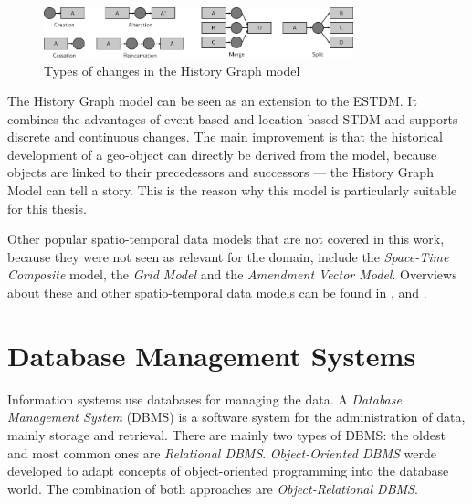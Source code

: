\begin{figure}[ht]
  \vspace{1em}
  \centering
  \includegraphics[width=0.8\textwidth]{graphics/basics/stdm/history_graph_changes}
  \caption{Types of changes in the History Graph model}
  \label{fig:history_graph_changes}
\end{figure}

The History Graph model can be seen as an extension to the ESTDM. It combines the advantages of event-based and location-based STDM and supports discrete and continuous changes. The main improvement is that the historical development of a geo-object can directly be derived from the model, because objects are linked to their precedessors and successors --- the History Graph Model can tell a story. This is the reason why this model is particularly suitable for this thesis.


\vspace{1em}
Other popular spatio-temporal data models that are not covered in this work, because they were not seen as relevant for the domain, include the \emph{Space-Time Composite} model, the \emph{Grid Model} and the \emph{Amendment Vector Model}. Overviews about these and other spatio-temporal data models can be found in \cite{zhao11}, \cite{pelekis04stdms} and \cite{peuquet99}.



\section{Database Management Systems} %
\label{sec:database_management_systems}

Information systems use databases for managing the data. A \emph{Database Management System} (DBMS) is a software system for the administration of data, mainly storage and retrieval. There are mainly two types of DBMS: the oldest and most common ones are \emph{Relational DBMS}. \emph{Object-Oriented DBMS} werde developed to adapt concepts of object-oriented programming into the database world. The combination of both approaches are \emph{Object-Relational DBMS}.

